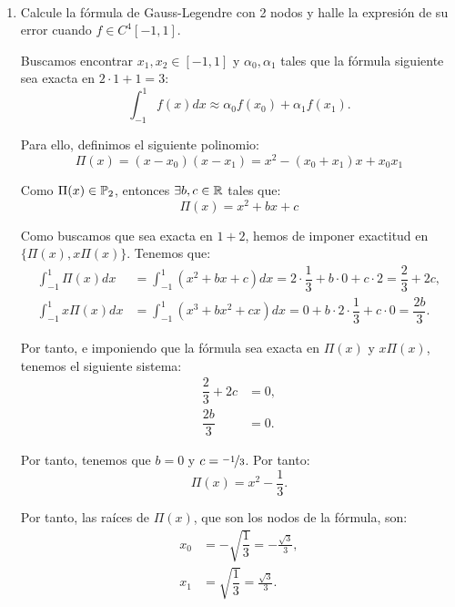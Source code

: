 \begin{ejercicio}\label{ej:2.1.23}~
    \begin{enumerate}
        \item Calcule la fórmula de Gauss-Legendre con 2 nodos y halle la expresión de su error cuando $f \in C^4[-1, 1]$.
        
        Buscamos encontrar $x_1,x_2\in [-1, 1]$ y $\alpha_0, \alpha_1$ tales que la fórmula siguiente sea exacta en $2\cdot 1+1 = 3$:
        \begin{equation*}
            \int_{-1}^{1} f(x) dx \approx \alpha_0 f(x_0) + \alpha_1 f(x_1).
        \end{equation*}

        Para ello, definimos el siguiente polinomio:
        \begin{equation*}
            \Pi(x) = (x-x_0)(x-x_1) = x^2 - (x_0+x_1)x + x_0x_1
        \end{equation*}

        Como $\Pi(x)\in \mathbb{P}_2$, entonces $\exists b,c\in \mathbb{R}$ tales que:
        \begin{equation*}
            \Pi(x) = x^2+bx+c
        \end{equation*}

        Como buscamos que sea exacta en $1+2$, hemos de imponer exactitud en $\{\Pi(x), x\Pi(x)\}$. Tenemos que:
        \begin{align*}
            \int_{-1}^{1} \Pi(x) dx &= \int_{-1}^{1} (x^2 + bx + c) dx = 2\cdot \dfrac{1}{3} + b\cdot 0 + c\cdot 2 = \dfrac{2}{3} + 2c,\\
            \int_{-1}^{1} x\Pi(x) dx &= \int_{-1}^{1} (x^3 + bx^2 + cx) dx = 0 + b\cdot 2\cdot \dfrac{1}{3} + c\cdot 0 = \dfrac{2b}{3}.
        \end{align*}
        
        Por tanto, e imponiendo que la fórmula sea exacta en $\Pi(x)$ y $x\Pi(x)$, tenemos el siguiente sistema:
        \begin{align*}
            \dfrac{2}{3} + 2c &= 0,\\
            \dfrac{2b}{3} &= 0.
        \end{align*}

        Por tanto, tenemos que $b = 0$ y $c = \nicefrac{-1}{3}$. Por tanto:
        \begin{equation*}
            \Pi(x) = x^2 - \dfrac{1}{3}.
        \end{equation*}

        Por tanto, las raíces de $\Pi(x)$, que son los nodos de la fórmula, son:
        \begin{align*}
            x_0 &= -\sqrt{\dfrac{1}{3}} = -\frac{\sqrt{3}}{3},\\
            x_1 &= \sqrt{\dfrac{1}{3}} = \frac{\sqrt{3}}{3}.
        \end{align*}


\end{enumerate}
\end{ejercicio}
